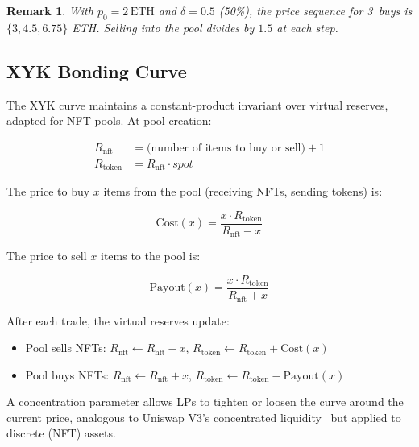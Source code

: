 \documentclass[11pt,a4paper]{article}
\newtheorem{remark}{Remark}[section]
\begin{document}
\begin{remark}
With $p_0 = 2\,\text{ETH}$ and $\delta = 0.5$ (50\%), the price
sequence for 3~buys is $\{3, 4.5, 6.75\}$ ETH. Selling into the
pool divides by $1.5$ at each step.
\end{remark}

\subsection{XYK Bonding Curve}

The XYK curve maintains a constant-product invariant over virtual
reserves, adapted for NFT pools. At pool creation:

\begin{align}
R_{\text{nft}} &= \text{(number of items to buy or sell)} + 1
  \label{eq:xyk-nft} \\
R_{\text{token}} &= R_{\text{nft}} \cdot \mathit{spot}
  \label{eq:xyk-token}
\end{align}

The price to buy $x$ items from the pool (receiving NFTs, sending
tokens) is:

\begin{equation}\label{eq:xyk-buy}
\text{Cost}(x) = \frac{x \cdot R_{\text{token}}}{R_{\text{nft}} - x}
\end{equation}

The price to sell $x$ items to the pool is:

\begin{equation}\label{eq:xyk-sell}
\text{Payout}(x) = \frac{x \cdot R_{\text{token}}}{R_{\text{nft}} + x}
\end{equation}

After each trade, the virtual reserves update:
\begin{itemize}[nosep]
  \item Pool sells NFTs:
    $R_{\text{nft}} \leftarrow R_{\text{nft}} - x$, \;
    $R_{\text{token}} \leftarrow R_{\text{token}} + \text{Cost}(x)$
  \item Pool buys NFTs:
    $R_{\text{nft}} \leftarrow R_{\text{nft}} + x$, \;
    $R_{\text{token}} \leftarrow R_{\text{token}} - \text{Payout}(x)$
\end{itemize}

A concentration parameter allows LPs to tighten or loosen the curve
around the current price, analogous to Uniswap V3's concentrated
liquidity~\cite{uniswapv3} but applied to discrete (NFT) assets.

\end{document}
